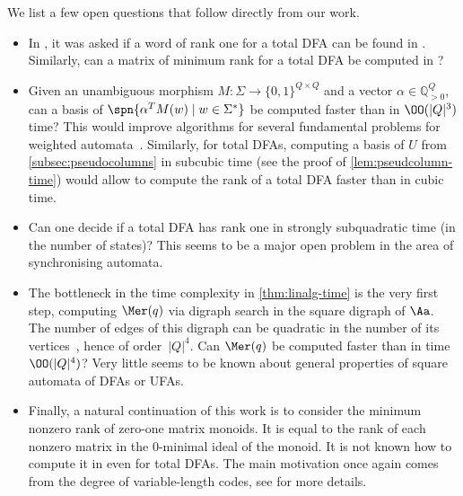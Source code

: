 We list a few open questions that follow directly from our work.

\begin{itemize}
    \item In \cite{Eppstein1990}, it was asked if a word of rank one for a total DFA can be found in \NC. Similarly, can a matrix of minimum rank for a total DFA be computed in \NC?

    \item Given an unambiguous morphism $M \colon \Sigma \to \{0, 1\}^{Q \times Q}$ and a vector $\alpha \in \mathbb{Q}_{>0}^Q$, can a basis of  $\spn{\alpha^T M(w) \mid w \in \Sigma^*}$ be computed faster than in $\OO(|Q|^3)$ time? This would improve algorithms for several fundamental problems for weighted automata~\cite{KieferWeighted20}. Similarly, for total DFAs, computing a basis of $U$ from \autoref{subsec:pseudocolumns} in subcubic time (see the proof of \autoref{lem:pseudcolumn-time}) would allow to compute the rank of a total DFA faster than in cubic time.

    \item Can one decide if a total DFA has rank one in strongly subquadratic time (in the number of states)? This seems to be a major open problem in the area of synchronising automata.
    
    \item The bottleneck in the time complexity in \autoref{thm:linalg-time} is the very first step, computing $\Mer(q)$ via digraph search in the square digraph of $\Aa$. The number of edges of this digraph can be quadratic in the number of its vertices~\cite[Appendix A]{Kiefer2019Arxiv}, hence of order~$|Q|^4$. Can $\Mer(q)$ be computed faster than in time $\OO(|Q|^4)$? Very little seems to be known about general properties of square automata of DFAs or UFAs.

    \item Finally, a natural continuation of this work is to consider the minimum nonzero rank of zero-one matrix monoids. It is equal to the rank of each nonzero matrix in the 0-minimal ideal of the monoid. It is not known how to compute it in \NC even for total DFAs. The main motivation once again comes from the degree of variable-length codes, see \cite[Chapter 9]{Berstel2010} for more details. 
\end{itemize}